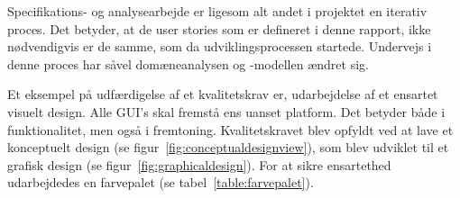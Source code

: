 Specifikations- og analysearbejde er ligesom alt andet i projektet en iterativ proces. Det betyder, at de user stories som er defineret i denne rapport, ikke nødvendigvis er de samme, som da udviklingsprocessen startede. Undervejs i denne proces har såvel domæneanalysen og -modellen ændret sig.

Et eksempel på udfærdigelse af et kvalitetskrav er, udarbejdelse af et ensartet visuelt design. Alle GUI's skal fremstå ens uanset platform. Det betyder både i funktionalitet, men også i fremtoning. Kvalitetskravet blev opfyldt ved at lave et konceptuelt design (se figur~\ref{fig:conceptualdesignview}), som blev udviklet til et grafisk design (se figur~\ref{fig:graphicaldesign}). For at sikre ensartethed udarbejdedes en farvepalet (se tabel~\ref{table:farvepalet}).




